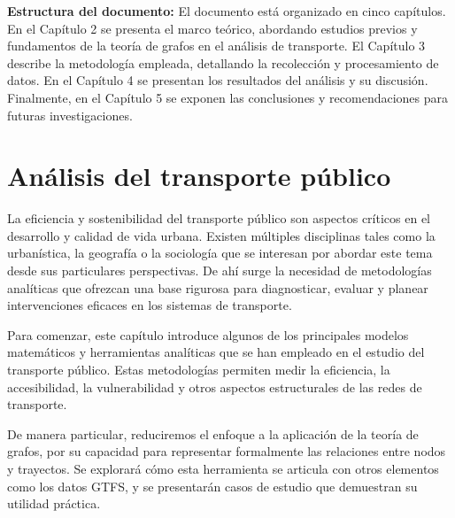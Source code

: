 \documentclass[openany]{book}
\begin{document}
	\textbf{Estructura del documento:}
	El documento está organizado en cinco capítulos. En el Capítulo 2 se presenta el marco teórico, abordando estudios previos y fundamentos de la teoría de grafos en el análisis de transporte. El Capítulo 3 describe la metodología empleada, detallando la recolección y procesamiento de datos. En el Capítulo 4 se presentan los resultados del análisis y su discusión. Finalmente, en el Capítulo 5 se exponen las conclusiones y recomendaciones para futuras investigaciones.

\chapter{Análisis del transporte público}

	La eficiencia y sostenibilidad del transporte público son aspectos críticos en el desarrollo y calidad de vida urbana. Existen múltiples disciplinas tales como la urbanística, la geografía o la sociología que se interesan por abordar este tema desde sus particulares perspectivas. De ahí surge la necesidad de metodologías analíticas que ofrezcan una base rigurosa para diagnosticar, evaluar y planear intervenciones eficaces en los sistemas de transporte.

	Para comenzar, este capítulo introduce algunos de los principales modelos matemáticos y herramientas analíticas que se han empleado en el estudio del transporte público. Estas metodologías permiten medir la eficiencia, la accesibilidad, la vulnerabilidad y otros aspectos estructurales de las redes de transporte.

	De manera particular, reduciremos el enfoque a la aplicación de la teoría de grafos, por su capacidad para representar formalmente las relaciones entre nodos y trayectos. Se explorará cómo esta herramienta se articula con otros elementos como los datos GTFS, y se presentarán casos de estudio que demuestran su utilidad práctica.
\end{document}
